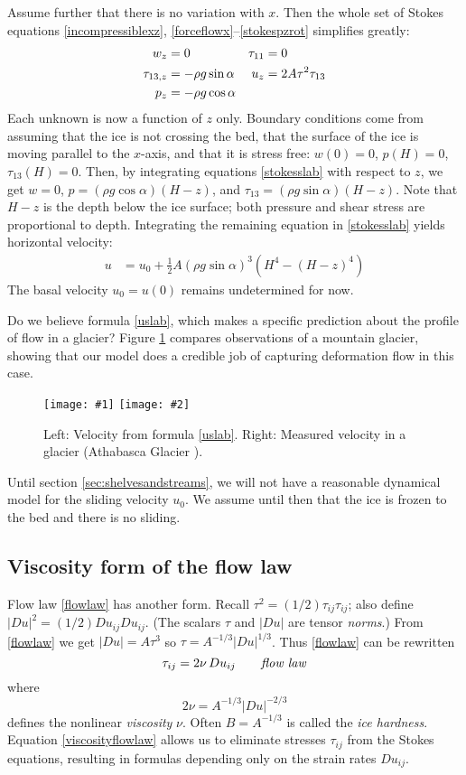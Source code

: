 \documentclass[letterpaper,final,12pt,reqno]{amsart}
\newcommand{\twofigsizes}[5]{
\begin{figure}[ht]
\centering
\texttt{[image: \#1]} \quad
\texttt{[image: \#2]}
\caption{#3}
\label{fig:#1}
\end{figure}}
\begin{document}
Assume further that there is no variation with $x$. Then the whole set of Stokes equations \eqref{incompressiblexz}, \eqref{forceflowx}--\eqref{stokespzrot} simplifies greatly:
\begin{align}
w_z &= 0 &   \tau_{11} &= 0 \label{stokesslab} \\
\tau_{13,z} &= - \rho g \sin\alpha &   u_z &= 2 A \tau^2 \tau_{13} \notag \\
p_z &= - \rho g \cos\alpha \notag
\end{align}
Each unknown is now a function of $z$ only.  Boundary conditions come from assuming that the ice is not crossing the bed, that the surface of the ice is moving parallel to the $x$-axis, and that it is stress free: $w(0)=0$, $p(H)=0$, $\tau_{13}(H)=0$.  Then, by integrating equations \eqref{stokesslab} with respect to $z$, we get $w=0$, $p = (\rho g \cos\alpha) (H-z)$, and $\tau_{13} = (\rho g \sin\alpha) (H-z)$.  Note that $H-z$ is the depth below the ice surface; both pressure and shear stress are proportional to depth.  Integrating the remaining equation in \eqref{stokesslab} yields horizontal velocity:
\begin{align}
u &= u_0 + \frac{1}{2} A (\rho g \sin\alpha)^3  \left(H^4 - (H-z)^4\right)  \label{uslab}
\end{align}
The basal velocity $u_0=u(0)$ remains undetermined for now.

Do we believe formula \eqref{uslab}, which makes a specific prediction about the profile of flow in a glacier?  Figure \ref{fig:slabvel} compares observations of a mountain glacier, showing that our model does a credible job of capturing deformation flow in this case.

\twofigsizes{slabvel}{athabasca-deform}{Left:  Velocity from formula \eqref{uslab}.  Right:  Measured velocity in a glacier (Athabasca Glacier \cite{SavagePaterson}).}{2.0in}{1.8in}

Until section \ref{sec:shelvesandstreams}, we will not have a reasonable dynamical model for the sliding velocity $u_0$.  We assume until then that the ice is frozen to the bed and there is no sliding.


\subsection*{Viscosity form of the flow law}  Flow law \eqref{flowlaw} has another form.  Recall $\tau^2 = (1/2) \tau_{ij} \tau_{ij}$; also define $|Du|^2 = (1/2) Du_{ij} Du_{ij}$.  (The scalars $\tau$ and $|Du|$ are tensor \emph{norms}.)  From \eqref{flowlaw} we get $|Du| = A \tau^3$ so $\tau = A^{-1/3} |Du|^{1/3}$.  Thus \eqref{flowlaw} can be rewritten
\begin{equation}
\tau_{ij} = 2 \nu\, Du_{ij}  \qquad \text{\emph{flow law}} \label{viscosityflowlaw}
\end{equation}
where
    $$2\nu = A^{-1/3} |Du|^{-2/3}$$
defines the nonlinear \emph{viscosity} $\nu$.  Often $B = A^{-1/3}$ is called the \emph{ice hardness}.  Equation \eqref{viscosityflowlaw} allows us to eliminate stresses $\tau_{ij}$ from the Stokes equations, resulting in formulas depending only on the strain rates $Du_{ij}$.
\end{document}
